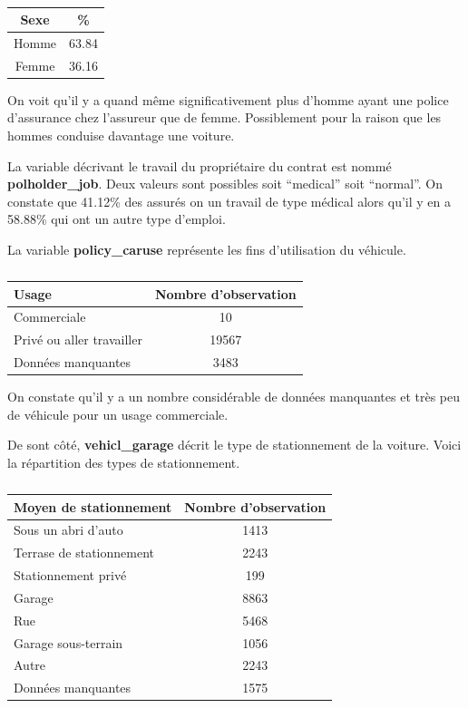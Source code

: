 \documentclass[
]{article}
\begin{document}
\begin{table}[ht]
\centering
\caption{} 
\label{}
\begin{tabular}{cc}
  \hline
Sexe & \% \\ 
  \hline
Homme & 63.84 \\ 
  Femme & 36.16 \\ 
   \hline
\end{tabular}
\end{table}

On voit qu'il y a quand même significativement plus d'homme ayant une
police d'assurance chez l'assureur que de femme. Possiblement pour la
raison que les hommes conduise davantage une voiture.

La variable décrivant le travail du propriétaire du contrat est nommé
\textbf{polholder\_job}. Deux valeurs sont possibles soit ``medical''
soit ``normal''. On constate que 41.12\% des assurés on un travail de
type médical alors qu'il y en a 58.88\% qui ont un autre type d'emploi.

La variable \textbf{policy\_caruse} représente les fins d'utilisation du
véhicule.

\begin{table}[ht]
\centering
\caption{} 
\label{}
\begin{tabular}{lc}
  \hline
Usage & Nombre d'observation \\ 
  \hline
Commerciale & 10 \\ 
  Privé ou aller travailler & 19567 \\ 
  Données manquantes & 3483 \\ 
   \hline
\end{tabular}
\end{table}

On constate qu'il y a un nombre considérable de données manquantes et
très peu de véhicule pour un usage commerciale.

De sont côté, \textbf{vehicl\_garage} décrit le type de stationnement de
la voiture. Voici la répartition des types de stationnement.

\begin{table}[ht]
\centering
\caption{} 
\label{}
\begin{tabular}{lc}
  \hline
Moyen de stationnement & Nombre d'observation \\ 
  \hline
Sous un abri d'auto & 1413 \\ 
  Terrase de stationnement & 2243 \\ 
  Stationnement privé & 199 \\ 
  Garage & 8863 \\ 
  Rue & 5468 \\ 
  Garage sous-terrain & 1056 \\ 
  Autre & 2243 \\ 
  Données manquantes & 1575 \\ 
   \hline
\end{tabular}
\end{table}
\end{document}
